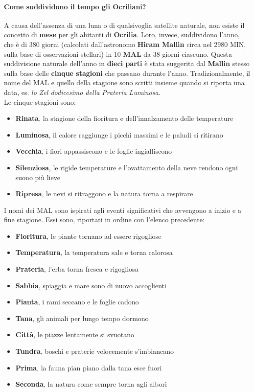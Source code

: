 \documentclass[10pt,twoside,onecolumn,openany]{book}
\begin{document}
\paragraph{Come suddividono il tempo gli Ocriliani?}
A causa dell'assenza di una luna o di qualsivoglia satellite naturale, non esiste il concetto di \textbf{mese} per gli abitanti di \textbf{Ocrilia}. Loro, invece, suddividono l'anno, che è di 380 giorni (calcolati dall'astronomo \textbf{Hiram Mallin} circa nel 2980 MIN, sulla base di osservazioni stellari) in 10 \textbf{MAL} da 38 giorni ciascuno. Questa suddivisione naturale dell'anno in \textbf{dieci parti} è stata suggerita dal \textbf{Mallin} stesso sulla base delle \textbf{cinque stagioni} che passano durante l'anno. Tradizionalmente, il nome del MAL e quello della stagione sono scritti insieme quando si riporta una data, es. \textit{lo Zel dodicesimo della Prateria Luminosa}.\\
Le cinque stagioni sono:
\begin{multicols}{2}
\begin{itemize}
\item \textbf{Rinata}, la stagione della fioritura e dell'innalzamento delle temperature
\item \textbf{Luminosa}, il calore raggiunge i picchi massimi e le paludi si ritirano
\item \textbf{Vecchia}, i fiori appassiscono e le foglie ingialliscono
\item \textbf{Silenziosa}, le rigide temperature e l'ovattamento della neve rendono ogni suono più lieve
\item \textbf{Ripresa}, le nevi si ritraggono e la natura torna a respirare
\end{itemize}
\end{multicols}
I nomi dei MAL sono ispirati agli eventi significativi che avvengono a inizio e a fine stagione. Essi sono, riportati in ordine con l'elenco precedente:
\begin{multicols}{2}
\begin{itemize}
\item \textbf{Fioritura}, le piante tornano ad essere rigogliose
\item \textbf{Temperatura}, la temperatura sale e torna calorosa
\item \textbf{Prateria}, l'erba torna fresca e rigogliosa
\item \textbf{Sabbia}, spiaggia e mare sono di nuovo accoglienti
\item \textbf{Pianta}, i rami seccano e le foglie cadono
\item \textbf{Tana}, gli animali per lungo tempo dormono
\item \textbf{Città}, le piazze lentamente si svuotano
\item \textbf{Tundra}, boschi e praterie velocemente s'imbiancano
\item \textbf{Prima}, la fauna pian piano dalla tana esce fuori
\item \textbf{Seconda}, la natura come sempre torna agli albori
\end{itemize}
\end{multicols}
\end{document}
